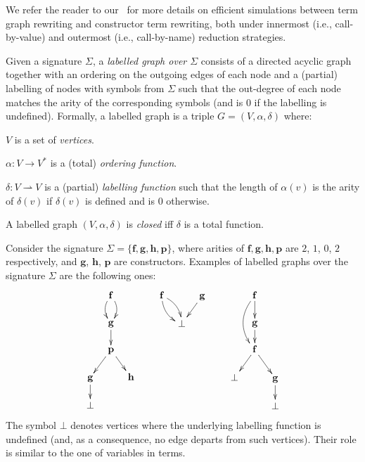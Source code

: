 \documentclass{LMCS}
\newcommand{\funone}{\mathbf{f}}
\newcommand{\funtwo}{\mathbf{g}}
\newcommand{\funthree}{\mathbf{h}}
\newcommand{\funfour}{\mathbf{p}}
\newcommand{\sigone}{\Sigma}
\newcommand{\vsone}{V}
\newcommand{\ordone}{\alpha}
\newcommand{\labelone}{\delta}
\newcommand{\verone}{v}
\newcommand{\tgone}{G}
\newenvironment{varitemize}
{
\begin{list}{\labelitemi}
{\setlength{\itemsep}{0.0mm}
 \setlength{\topsep}{0.0mm}
 \setlength{\parindent}{0.0mm}
 \setlength{\parskip}{0.0mm}
 \setlength{\parsep}{0.0mm}
 \setlength{\partopsep}{0.0mm}
 \setlength{\leftmargin}{15pt}
 \setlength{\labelsep}{5pt}
 \setlength{\labelwidth}{10pt}}}
{
 \end{list} 
}
\begin{document}
We refer the reader to our~\cite{DLM09} for more details on efficient simulations between 
term graph rewriting and constructor term rewriting, both under innermost 
(i.e., call-by-value) and outermost (i.e., call-by-name) reduction strategies.

\begin{defi}
Given a signature $\sigone$, a \emph{labelled graph over $\sigone$} consists of a directed
acyclic graph together with an ordering on the outgoing edges of each node and a (partial)
labelling of nodes with symbols from $\sigone$ such that the out-degree of each node
matches the arity of the corresponding symbols (and is $0$ if the labelling is undefined).
Formally, a labelled graph is a triple $\tgone=(\vsone,\ordone,\labelone)$
where: 
\begin{varitemize}
\item
  $\vsone$ is a set of \emph{vertices}.
\item
  $\ordone:\vsone\rightarrow\vsone^*$ is a (total) \emph{ordering function}.
\item
  $\labelone:\vsone\rightharpoonup\vsone$ is a (partial) \emph{labelling function} such
  that the length of $\ordone(\verone)$ is the arity of $\labelone(\verone)$ if
  $\labelone(\verone)$ is defined and is $0$ otherwise.
\end{varitemize}
A labelled graph $(\vsone,\ordone,\labelone)$ is \emph{closed} iff $\labelone$ is a 
total function. 
\end{defi}
Consider the signature $\Sigma=\{\funone,\funtwo,\funthree,\funfour\}$, where
arities of $\funone,\funtwo,\funthree,\funfour$ are $2$, $1$, $0$, $2$ respectively, and
$\funtwo$, $\funthree$, $\funfour$ are constructors. Examples of labelled graphs over 
the signature $\Sigma$ are the following ones:
\begin{displaymath}
\xymatrix@R=15pt@C=8pt{
     & \funone \ar@/_/[d]\ar@/^/[d] &   \\
     & \funtwo \ar[d] &   \\
     & \funfour \ar[dl]\ar[dr] &   \\
\funtwo \ar[d] &          & \funthree \\
\bot &          &   \\
}
\hspace{20pt}
\xymatrix@R=15pt@C=8pt{
\funone\ar@/^/[dr]\ar@/_/[dr] & & \funtwo \ar[dl]\\
          & \bot &                         \\
}
\hspace{20pt}
\xymatrix@R=15pt@C=8pt{
     & \funone\ar@/_1pc/[dd]\ar[d] &   \\
     & \funtwo \ar[d] &   \\
     & \funone \ar[dl]\ar[dr] &   \\
\bot &          & \funtwo\ar[d] \\
     &          & \bot  \\
}
\end{displaymath}
The symbol $\bot$ denotes vertices where the underlying labelling function
is undefined (and, as a consequence, no edge departs from such vertices).
Their role is similar to the one of variables in terms.
\end{document}
